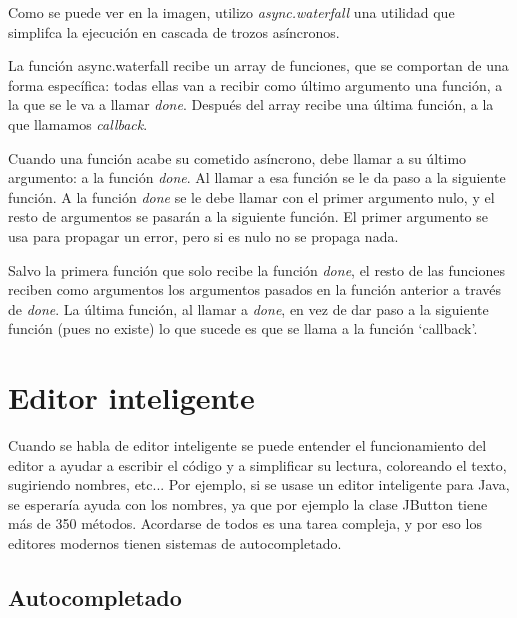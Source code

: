 \documentclass{report}
\begin{document}
	 Como se puede ver en la imagen, utilizo \textit{async.waterfall} una utilidad\cite{async} que simplifca la ejecución en cascada de trozos asíncronos.
	 
	 \vspace{10px}
	 
	 La función async.waterfall recibe un array de funciones, que se comportan de una forma específica: todas ellas van a recibir como último argumento una función, a la que se le va a llamar \textit{done}. Después del array recibe una última función, a la que llamamos \textit{callback}.
	 
	 \vspace{10px}
	 
	 Cuando una función acabe su cometido asíncrono, debe llamar a su último argumento: a la función \textit{done}. Al llamar a esa función se le da paso a la siguiente función. A la función \textit{done} se le debe llamar con el primer argumento nulo, y el resto de argumentos se pasarán a la siguiente función. El primer argumento se usa para propagar un error, pero si es nulo no se propaga nada.   
	 
	 \vspace{10px}
	 
	 Salvo la primera función que solo recibe la función \textit{done}, el resto de las funciones reciben como argumentos los argumentos pasados en la función anterior a través de \textit{done}. La última función, al llamar a \textit{done}, en vez de dar paso a la siguiente función (pues no existe) lo que sucede es que se llama a la función `callback'.
	
	\section{Editor inteligente}
	
	Cuando se habla de editor inteligente se puede entender el funcionamiento del editor a ayudar a escribir el código y a simplificar su lectura, coloreando el texto, sugiriendo nombres, etc... Por ejemplo, si se usase un editor inteligente para Java, se esperaría ayuda con los nombres, ya que por ejemplo la clase JButton tiene más de 350 métodos. Acordarse de todos es una tarea compleja, y por eso los editores modernos tienen sistemas de autocompletado. 
	
	\vspace{10px}
	
	\subsection{Autocompletado}
	
\end{document}
